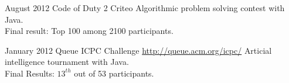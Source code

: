 \documentclass[11pt,a4paper]{moderncv}
\begin{document}


\cventry
{August 2012}
{Code of Duty 2}
{Criteo}
{}
{}
{Algorithmic problem solving contest with Java.\\Final result: Top 100 among 2100 participants.}


\cventry
{January 2012}
{Queue ICPC Challenge}
{}
{\url{http://queue.acm.org/icpc/}}
{}
{Articial intelligence tournament with Java.\\Final Results: $13^{th}$ out of 53 participants.}


\nocite{*}

\end{document}
